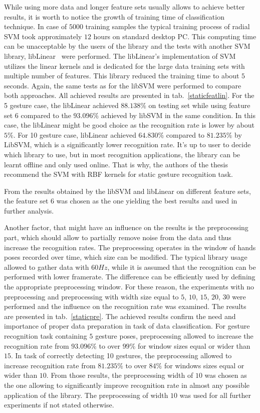 While using more data and longer feature sets usually allows to achieve better results, it is worth to notice the growth of training time of classification technique. 
In case of $5000$ training samples the typical training process of radial SVM took approximately $12$ hours on standard desktop PC. 
This computing time can be unacceptable by the users of the library and the tests with another SVM library, libLinear~\cite{libLinear} were performed. 
The libLinear's implementation of SVM utilizes the linear kernels and is dedicated for the large data training sets with multiple number of features. 
This library reduced the training time to about $5$ seconds.
Again, the same tests as for the libSVM were performed to compare both approaches.
All achieved results are presented in tab.~\ref{staticfeatlin}.
For the 5 gesture case, the libLinear achieved $88.138\%$ on testing set while using feature set 6 compared to the $93.096\%$ achieved by libSVM in the same condition.
In this case, the libLinear might be good choice as the recognition rate is lower by about $5\%$.
For 10 gesture case, libLinear achieved $64.830\%$ compared to $81.235\%$ by LibSVM, which is a significantly lower recognition rate.
It's up to user to decide which library to use, but in most recognition applications, the library can be learnt offline and only used online.
That is why, the authors of the thesis recommend the SVM with RBF kernels for static gesture recognition task.

From the results obtained by the libSVM and libLinear on different feature sets, the feature set $6$ was chosen as the one yielding the best results and used in further analysis.


Another factor, that might have an influence on the results is the preprocessing part, which should allow to partially remove noise from the data and thus increase the recognition rates. 
The preprocessing operates in the window of hands poses recorded over time, which size can be modified. 
The typical library usage allowed to gather data with $60Hz$, while it is assumed that the recognition can be performed with lower framerate. The difference can be efficiently used by defining the appropriate preprocessing window.
For these reason, the experiments with no preprocessing and preprocessing with width size equal to $5$, $10$, $15$, $20$, $30$ were performed and the influence on the recognition rate was examined.
The results are presented in tab.~\ref{staticpre}.
The achieved results confirm the need and importance of proper data preparation in task of data classification.
For gesture recognition task containing $5$ gesture poses, preprocessing allowed to increase the recognition rate from $93.096\%$ to over $99\%$ for window sizes equal or wider than $15$. 
In task of correctly detecting 10 gestures, the preprocessing allowed to increase recognition rate from $81.235\%$ to over $84\%$ for windows sizes equal or wider than $10$.
From those results, the preprocessing width of $10$ was chosen as the one allowing to significantly improve recognition rate in almost any possible application of the library.
The preprocessing of width $10$ was used for all further experiments if not stated otherwise.

